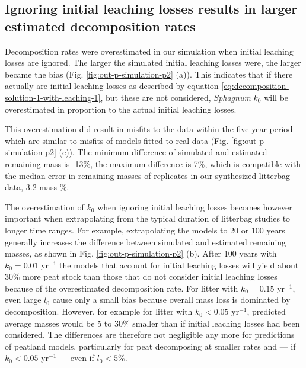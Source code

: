 \documentclass[bg, manuscript]{copernicus}
\begin{document}
\hypertarget{out-res-2}{%
\subsection{Ignoring initial leaching losses results in larger estimated decomposition rates}\label{out-res-2}}

Decomposition rates were overestimated in our simulation when initial leaching losses are ignored. The larger the simulated initial leaching losses were, the larger became the bias (Fig. \ref{fig:out-p-simulation-p2} (a)). This indicates that if there actually are initial leaching losses as described by equation \eqref{eq:decomposition-solution-1-with-leaching-1}, but these are not considered, \emph{Sphagnum} \(k_0\) will be overestimated in proportion to the actual initial leaching losses.

This overestimation did result in misfits to the data within the five year period which are similar to misfits of models fitted to real data (Fig. \ref{fig:out-p-simulation-p2} (c)). The minimum difference of simulated and estimated remaining mass is -13\%, the maximum difference is 7\%, which is compatible with the median error in remaining masses of replicates in our synthesized litterbag data, 3.2 mass-\%.

The overestimation of \(k_0\) when ignoring initial leaching losses becomes however important when extrapolating from the typical duration of litterbag studies to longer time ranges. For example, extrapolating the models to 20 or 100 years generally increases the difference between simulated and estimated remaining masses, as shown in Fig. \ref{fig:out-p-simulation-p2} (b). After 100 years with \(k_0 = 0.01\) yr\(^{-1}\) the models that account for initial leaching losses will yield about 30\% more peat stock than those that do not consider initial leaching losses because of the overestimated decomposition rate. For litter with \(k_0 = 0.15\) yr\(^{-1}\), even large \(l_0\) cause only a small bias because overall mass loss is dominated by decomposition. However, for example for litter with \(k_0<0.05\) yr\(^{-1}\), predicted average masses would be 5 to 30\% smaller than if initial leaching losses had been considered. The differences are therefore not negligible any more for predictions of peatland models, particularly for peat decomposing at smaller rates and --- if \(k_0<0.05\) yr\(^{-1}\) --- even if \(l_0<5\)\%.
\end{document}
